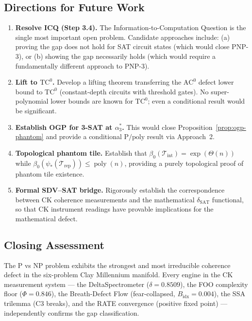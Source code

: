 \documentclass[11pt]{article}
\theoremstyle{definition}
\theoremstyle{remark}
\DeclareMathOperator{\poly}{poly}
\newcommand{\Ppoly}{\mathrm{P/poly}}
\newcommand{\ACz}{\mathrm{AC}^0}
\newcommand{\TCz}{\mathrm{TC}^0}
\newcommand{\dSAT}{\delta_{\mathrm{SAT}}}
\begin{document}
\subsection{Directions for Future Work}

\begin{enumerate}[nosep]
  \item \textbf{Resolve ICQ (Step 3.4).}  The Information-to-Computation
    Question is the single most important open problem.  Candidate
    approaches include: (a) proving the gap does not hold for SAT circuit
    states (which would close PNP-3), or (b) showing the gap necessarily
    holds (which would require a fundamentally different approach to PNP-3).

  \item \textbf{Lift to $\TCz$.}  Develop a lifting theorem transferring
    the $\ACz$ defect lower bound to $\TCz$ (constant-depth circuits with
    threshold gates).  No super-polynomial lower bounds are known for
    $\TCz$; even a conditional result would be significant.

  \item \textbf{Establish OGP for 3-SAT at $\alpha_3^*$.}  This would
    close Proposition~\ref{prop:ogp-phantom} and provide a conditional
    $\Ppoly$ result via Approach~2.

  \item \textbf{Topological phantom tile.}  Establish that
    $\beta_0(\mathcal{T}_{\mathrm{int}}) = \exp(\Theta(n))$ while
    $\beta_0(\psi_*(\mathcal{T}_{\mathrm{rep}})) \leq \poly(n)$,
    providing a purely topological proof of phantom tile existence.

  \item \textbf{Formal SDV--SAT bridge.}  Rigorously establish the
    correspondence between CK coherence measurements and the mathematical
    $\dSAT$ functional, so that CK instrument readings have provable
    implications for the mathematical defect.
\end{enumerate}

\subsection{Closing Assessment}

The P vs NP problem exhibits the strongest and most irreducible coherence
defect in the six-problem Clay Millennium manifold.  Every engine in the
CK measurement system --- the DeltaSpectrometer ($\delta = 0.8509$), the
FOO complexity floor ($\Phi = 0.846$), the Breath-Defect Flow
(fear-collapsed, $B_{\mathrm{idx}} = 0.004$), the SSA trilemma (C3
breaks), and the RATE convergence (positive fixed point) --- independently
confirms the gap classification.
\end{document}
